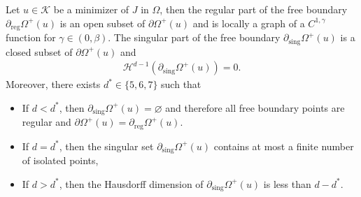 \documentclass[11pt,reqno]{amsart}
\begin{document}
\begin{theorem}\label{Theorem: Main theorem2}
	Let $u\in\mathcal{K}$ be a minimizer of $J$ in $\Omega$, then the regular part of the free boundary $\partial_{\mathrm{reg}}\varOmega^{+}(u)$ is an open subset of $\partial\varOmega^{+}(u)$ and is locally a graph of a $C^{1,\gamma}$ function for $\gamma\in(0,\beta)$. The singular part of the free boundary $\partial_{\mathrm{sing}}\varOmega^{+}(u)$ is a closed subset of $\partial\varOmega^{+}(u)$ and
	\begin{align*}
		\mathcal{H}^{d-1}(\partial_{\mathrm{sing}}\varOmega^{+}(u))=0.
	\end{align*} 
    Moreover, there exists $d^{*}\in\{5,6,7\}$ such that
	\begin{itemize}
		\item If $d<d^{*}$, then $\partial_{\mathrm{sing}}\varOmega^{+}(u)=\varnothing$ and therefore all free boundary points are regular and $\partial\varOmega^{+}(u)=\partial_{\mathrm{reg}}\varOmega^{+}(u)$.
		\item If $d=d^{*}$, then the singular set $\partial_{\mathrm{sing}}\varOmega^{+}(u)$ contains at most a finite number of isolated points,
		\item If $d>d^{*}$, then the Hausdorff dimension of $\partial_{\mathrm{sing}}\varOmega^{+}(u)$ is less than $d-d^{*}$.
	\end{itemize}
\end{theorem}
\end{document}
